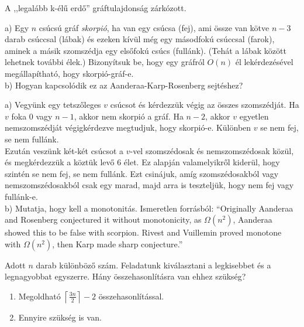 \begin{Exercise}[counter={sorszam}, difficulty=0]
	A ,,legalább k-élű erdő'' gráftulajdonság zárkózott.
\end{Exercise}

\begin{Exercise}[counter={sorszam}, difficulty=0]
	a) Egy $n$ csúcsú gráf {\em skorpió}, ha van egy csúcsa (fej), ami össze van kötve $n-3$ darab csúccsal (lábak) és ezeken k\'iv\"ul m\'eg egy másodfokú csúccsal (farok), aminek a másik szomszédja egy els\H ofokú csúcs (fullánk).  (Teh\'at a l\'abak k\"oz\"ott lehetnek tov\'abbi \'elek.) Bizonyítsuk be, hogy egy gráfról $O(n)$ él lekérdezésével megállapítható, hogy skorpió-gráf-e.\\
	b) Hogyan kapcsol\'odik ez az Aanderaa-Karp-Rosenberg sejt\'eshez?
\end{Exercise}
\begin{Answer}
	a) Vegy\"unk egy tetsz\H oleges $v$ cs\'ucsot \'es k\'erdezz\"uk v\'egig az \"osszes szomsz\'edj\'at. Ha $v$ foka 0 vagy $n-1$, akkor nem skorpi\'o a gr\'af. Ha $n-2$, akkor $v$ egyetlen nemszomsz\'edj\'at v\'egigk\'erdezve megtudjuk, hogy skorpi\'o-e. K\"ul\"onben $v$ se nem fej, se nem full\'ank.\\
	Ezut\'an vesz\"unk k\'et-k\'et cs\'ucsot a $v$-vel szomsz\'edosak \'es nemszomsz\'edosak k\"oz\"ul, \'es megk\'erdezz\"uk a k\"ozt\"uk lev\H o 6 \'elet. Ez alapj\'an valamelyikr\H ol kider\"ul, hogy szint\'en se nem fej, se nem full\'ank. Ezt csin\'ajuk, am\'ig szomsz\'edosakb\'ol vagy nemszomsz\'edosakb\'ol csak egy marad, majd arra is tesztelj\"uk, hogy nem fej vagy full\'ank-e.\\
	b) Mutatja, hogy kell a monotonit\'as.
	Ismeretlen forr\'asb\'ol: ``Originally Aanderaa and Rosenberg conjectured it without monotonicity, as $\Omega(n^2)$, Aanderaa showed this to be false with scorpion. Rivest and Vuillemin proved monotone with $\Omega(n^2)$, then Karp made sharp conjecture.''
\end{Answer}


\begin{Exercise}[counter={sorszam}, difficulty=0]
	Adott $n$ darab különböző szám. Feladatunk kiválasztani a legkisebbet és a
	legnagyobbat egyszerre. Hány összehasonlításra van ehhez szükség?
	
	\begin{enumerate}
		\item Megoldható $\left \lceil \frac{3n}{2} \right \rceil - 2$ összehasonlítással.
		\item \hard Ennyire szükség is van.
	\end{enumerate}
\end{Exercise}


